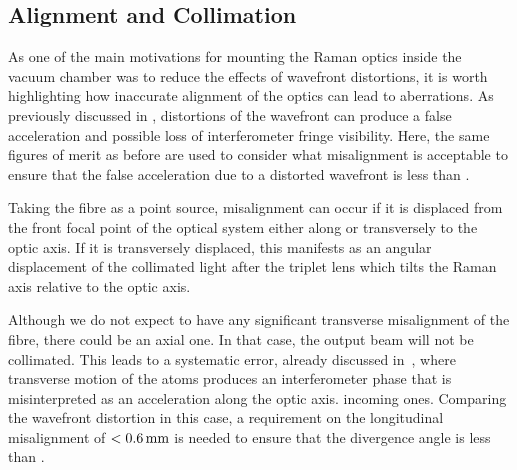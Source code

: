 \subsection{Alignment and Collimation}
As one of the main motivations for mounting the Raman optics inside the vacuum
chamber was to reduce the effects of wavefront distortions, it is worth
highlighting how inaccurate alignment of the optics can lead to aberrations. As
previously discussed in , distortions of the
wavefront can produce a false acceleration and possible loss of
interferometer fringe visibility. 
Here, the same figures of merit as before are used to consider what misalignment
is acceptable to ensure that the false acceleration due to a distorted
wavefront is less than .
\par\noindent 
Taking the fibre as a point source, misalignment can occur if it is displaced from the front focal point of the
optical system either along or transversely to the optic axis. If it is
transversely displaced, this manifests as an angular displacement of the
collimated light after the triplet lens which tilts the Raman axis
relative to the optic axis.   
\par\noindent 
Although we do not expect to have any significant transverse
misalignment of the fibre, there could be an axial one. In that case,
the output beam will not be collimated. This leads to a systematic
error, already discussed in~,
where transverse motion of the atoms produces an interferometer phase
that is misinterpreted as an acceleration along the optic axis. 
incoming ones. Comparing the
wavefront distortion in this case, a requirement on the longitudinal
misalignment of \(< \sivalue{0.6}{\milli\metre}\) is needed to ensure
that the divergence angle is less than .
